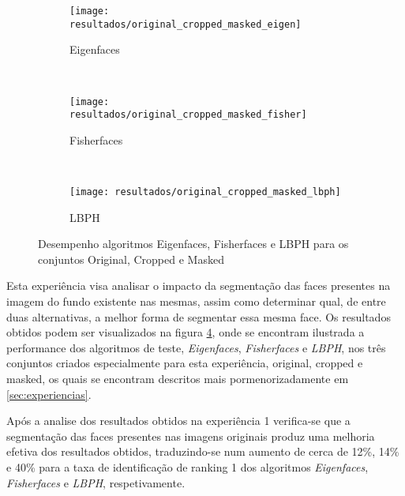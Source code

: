 \begin{figure}[h]
        \centering
        \begin{subfigure}[b]{0.65\textwidth}
                \centering
                \texttt{[image: resultados/original\_cropped\_masked\_eigen]}
                \caption{Eigenfaces}
                \label{fig:original_cropped_masked_eigen}
        \end{subfigure}%
        
        ~ %
        \begin{subfigure}[b]{0.65\textwidth}
                \centering
                \texttt{[image: resultados/original\_cropped\_masked\_fisher]}
                \caption{Fisherfaces}
                \label{fig:original_cropped_masked_fisher}
        \end{subfigure}
        
        ~ %
        \begin{subfigure}[b]{0.65\textwidth}
                \centering
                \texttt{[image: resultados/original\_cropped\_masked\_lbph]}
                \caption{LBPH}
                \label{fig:original_cropped_masked_lbph}
        \end{subfigure}
        \caption{Desempenho algoritmos Eigenfaces, Fisherfaces e LBPH para os conjuntos Original, Cropped e Masked}\label{fig:original_cropped_masked}
\end{figure}

Esta experiência visa analisar o impacto da segmentação das faces presentes na imagem do fundo existente nas mesmas, assim como determinar qual, de entre duas alternativas, a melhor forma de segmentar essa mesma face. Os resultados obtidos podem ser visualizados na figura \ref{fig:original_cropped_masked}, onde se encontram ilustrada a performance dos algoritmos de teste, \textit{Eigenfaces}, \textit{Fisherfaces} e \textit{LBPH}, nos três conjuntos criados especialmente para esta experiência, original, cropped e masked, os quais se encontram descritos mais pormenorizadamente em \ref{sec:experiencias}.

Após a analise dos resultados obtidos na experiência 1 verifica-se que a segmentação das faces presentes nas imagens originais produz uma melhoria efetiva dos resultados obtidos, traduzindo-se num aumento de cerca de 12\%, 14\% e 40\% para a taxa de identificação de ranking 1 dos algoritmos \textit{Eigenfaces}, \textit{Fisherfaces} e \textit{LBPH}, respetivamente.

